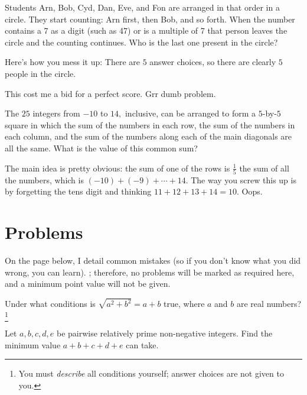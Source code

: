 \documentclass[mast]{lucky}
\begin{document}
\begin{exam}[AMC 8 2018/3]
Students Arn, Bob, Cyd, Dan, Eve, and Fon are arranged in that order in a circle. They start counting: Arn first, then Bob, and so forth. When the number contains a 7 as a digit (such as 47) or is a multiple of 7 that person leaves the circle and the counting continues. Who is the last one present in the circle?
\end{exam}

Here's how you mess it up: There are $5$ answer choices, so there are clearly $5$ people in the circle.

This cost me a bid for a perfect score. Grr dumb problem.

\begin{exam}[AMC 10A 2020/7]
The $25$ integers from $-10$ to $14,$ inclusive, can be arranged to form a $5$-by-$5$ square in which the sum of the numbers in each row, the sum of the numbers in each column, and the sum of the numbers along each of the main diagonals are all the same. What is the value of this common sum?
\end{exam}

The main idea is pretty obvious: the sum of one of the rows is $\frac{1}{5}$ the sum of all the numbers, which is $(-10)+(-9)+\cdots+14.$ The way you screw this up is by forgetting the tens digit and thinking $11+12+13+14=10.$ Oops.

\pagebreak

\section{Problems}

On the page below, I detail common mistakes (so if you don't know what you did wrong, you can learn). ; therefore, no problems will be marked as required here, and a minimum point value will not be given.


\begin{prob}[AMC 12A 2021/2]{2}
Under what conditions is $\sqrt{a^2+b^2}=a+b$ true, where $a$ and $b$ are real numbers?\footnote{You must \textit{describe} all conditions yourself; answer choices are not given to you.}
\end{prob}

\begin{prob}{2}
Let $a,b,c,d,e$ be pairwise relatively prime non-negative integers. Find the minimum value $a+b+c+d+e$ can take.
\end{prob}
\end{document}
